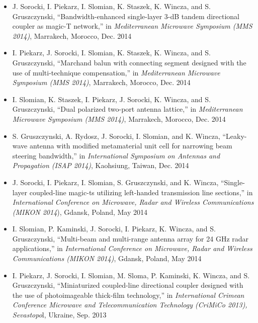 \begin{itemize}[nosep]
\item J. Sorocki, I. Piekarz, I. Slomian, K. Staszek, K. Wincza, and S. Gruszczynski,
“Bandwidth-enhanced single-layer 3-dB tandem directional coupler as magic-T network,” in
\textit{Mediterranean Microwave Symposium (MMS 2014)}, Marrakech, Morocco, Dec. 2014
\item I. Piekarz, J. Sorocki, I. Slomian, K. Staszek, K. Wincza, and S. Gruszczynski, “Marchand
balun with connecting segment designed with the use of multi-technique compensation,” in
\textit{Mediterranean Microwave Symposium (MMS 2014)}, Marrakech, Morocco, Dec. 2014
\item I. Slomian, K. Staszek, I. Piekarz, J. Sorocki, K. Wincza, and S. Gruszczynski, “Dual polarized two-port antenna lattice,” in \textit{Mediterranean Microwave Symposium (MMS 2014)}, Marrakech, Morocco, Dec. 2014
\item S. Gruszczynski, A. Rydosz, J. Sorocki, I. Slomian, and K. Wincza, “Leaky-wave antenna
with modified metamaterial unit cell for narrowing beam steering bandwidth,” in \textit{International Symposium on Antennas and Propagation (ISAP 2014)}, Kaohsiung, Taiwan, Dec. 2014
\item J. Sorocki, I. Piekarz, I. Slomian, S. Gruszczynski, and K. Wincza, “Single-layer coupled-line magic-ts utilizing left-handed transmission line sections,” in \textit{International Conference on Microwave, Radar and Wireless Communications (MIKON 2014}), Gdansk, Poland, May 2014
\item I. Slomian, P. Kaminski, J. Sorocki, I. Piekarz, K. Wincza, and S. Gruszczynski, “Multi-beam and multi-range antenna array for 24 GHz radar applications,” in \textit{International Conference on Microwave, Radar and Wireless Communications (MIKON 2014)}, Gdansk, Poland, May 2014
\item I. Piekarz, J. Sorocki, I. Slomian, M. Sloma, P. Kaminski, K. Wincza, and S. Gruszczynski,
“Miniaturized coupled-line directional coupler designed with the use of photoimageable thick-film
technology,” in \textit{International Crimean Conference Microwave and Telecommunication Technology (CriMiCo 2013), Sevastopo}l, Ukraine, Sep. 2013

\end{itemize}

